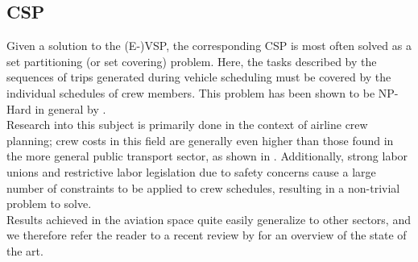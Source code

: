 \documentclass[]{article}
\begin{document}
\subsection{CSP}
Given a solution to the (E-)VSP, the corresponding CSP is most often solved as a set partitioning (or set covering) problem. Here, the tasks described by the sequences of trips generated during vehicle scheduling must be covered by the individual schedules of crew members. This problem has been shown to be NP-Hard in general by \citet{Fischetti1989}.\\
Research into this subject is primarily done in the context of airline crew planning; crew costs in this field are generally even higher than those found in the more general public transport sector, as shown in \citet{Barnhart2003}. Additionally, strong labor unions and restrictive labor legislation due to safety concerns cause a large number of constraints to be applied to crew schedules, resulting in a non-trivial problem to solve. \\
Results achieved in the aviation space quite easily generalize to other sectors, and we therefore refer the reader to a recent review by \citet{Deveci2018} for an overview of the state of the art. 
\end{document}

